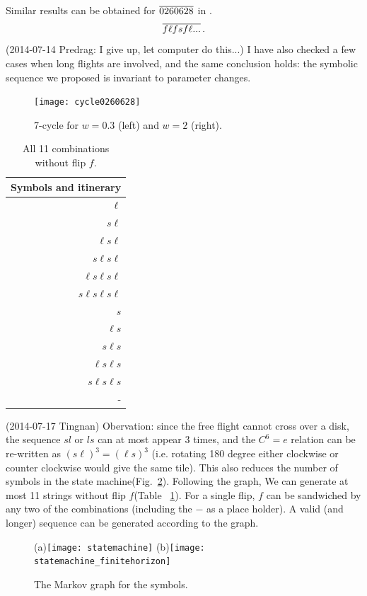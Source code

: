 Similar results can be obtained for ${\overline{0260628}}$ in
.
\[
{\overline{f \ell f s f \ell ...}}
\,.
\]
(2014-07-14 Predrag: I give up, let computer do this...)
I have also
checked a few cases when long flights are involved, and the same
conclusion holds: the symbolic sequence we proposed is invariant to
parameter changes.

\begin{figure}
\texttt{[image: cycle0260628]}
\caption{\label{fig:cycle0260628A}
7-cycle  for $w=0.3$ (left) and $w=2$ (right).
}
\end{figure}

\begin{table}
\begin{center}
\begin{tabular}{r}
Symbols and itinerary \\\hline
$\ell$  \\
$s\ell$ \\
$\ell s \ell$ \\
$s \ell s \ell$ \\
$\ell s \ell s \ell$ \\
$s\ell s \ell s \ell$ \\
$s$  \\
$\ell s$ \\
$s \ell s $ \\
$\ell s \ell s$ \\
$s \ell s \ell s$ \\
- \\\hline
\end{tabular}
\end{center}
\caption{All 11 combinations without flip $f$. }
\label{tab:11slcombos}
\end{table}
(2014-07-17 Tingnan) Obervation: since the free flight cannot cross over a disk, the sequence $sl$ or $ls$ can at most appear 3 times, and the $C^6=e$ relation can be re-written as $(s\ell)^3=(\ell s)^3$ (i.e. rotating 180 degree either clockwise or counter clockwise would give the same tile). This also reduces the number of symbols in the state machine(Fig.~\ref{fig:statemachine}). Following the graph, We can generate at most 11 strings without flip $f$(Table ~\ref{tab:11slcombos}). For a single flip, $f$ can be sandwiched by
any two of the combinations (including the $-$ as a place holder). A valid (and longer) sequence can be generated according to the graph.
\begin{figure}
(a)\texttt{[image: statemachine]}
(b)\texttt{[image: statemachine\_finitehorizon]}
\caption{\label{fig:statemachine} The Markov graph for the symbols.
}
\end{figure}

